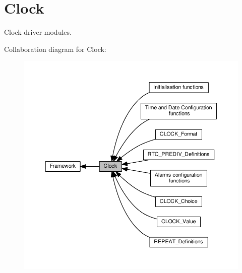 \hypertarget{group___clock}{}\section{Clock}
\label{group___clock}


Clock driver modules.  


Collaboration diagram for Clock\+:\nopagebreak
\begin{figure}[H]
\begin{center}
\leavevmode
\includegraphics[width=350pt]{d1/df2/group___clock}
\end{center}
\end{figure}
